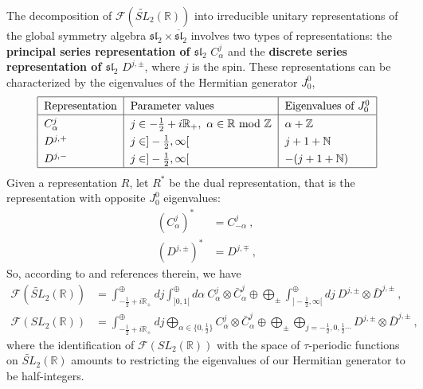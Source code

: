 \documentclass[12pt, a4paper, notitlepage, twoside]{report}
\numberwithin{equation}{section}
\theoremstyle{break}
\begin{document}
The decomposition of $\mathcal{F}(\widetilde{SL}_2(\mathbb{R}))$ into irreducible unitary representations of the global symmetry algebra $\mathfrak{sl}_2\times \overline{\mathfrak{sl}}_2$ involves two types of representations: the \textbf{\boldmath principal series representation of $\mathfrak{sl}_2$} $C^j_\alpha$ and the \textbf{\boldmath discrete series representation of $\mathfrak{sl}_2$} $D^{j,\pm}$, where $j$ is the spin. 
These representations can be characterized by the eigenvalues of the Hermitian generator $J_0^0$,
\begin{align} 
\renewcommand{\arraystretch}{1.3}
\begin{tabular}{|l|l|l|}
  \hline
Representation & Parameter values & Eigenvalues of $J_0^0$
\\
\hline 
$C^j_\alpha$  & $j\in -\tfrac12+i{\mathbb{R}}_+,\ \alpha\in{\mathbb{R}}\ \text{mod}\ {\mathbb{Z}}$ &  $\alpha + {\mathbb{Z}}$ 
\\
$D^{j,+}$ & $j\in]-\tfrac12,\infty[$ & $j+1+{\mathbb{N}}$
\\
$D^{j,-}$ & $j\in]-\tfrac12,\infty[$ & $-(j+1+{\mathbb{N}})$
\\
\hline 
 \end{tabular}
\label{rpe}
\end{align}
Given a representation $R$, let $R^*$ be the dual representation, that is the representation with opposite $J_0^0$ eigenvalues:
\begin{align}
 (C^j_\alpha)^* &= C^j_{-\alpha} \ , 
\\
 (D^{j,\pm})^* &= D^{j,\mp}\ ,
\end{align}
So, according to \cite{rib09} and references therein, we have
\begin{align}
 \mathcal{F}(\widetilde{SL}_2(\mathbb{R})) &= \int^\oplus_{-\frac12+i{\mathbb{R}}_+} dj \int^\oplus_{]0,1[} d\alpha\ C^j_\alpha \otimes \bar{C}^j_{\alpha} \oplus \bigoplus_\pm \int^\oplus_{]-\frac12, \infty[} dj\ D^{j,\pm}\otimes \bar{D}^{j,\pm} \ ,
\label{fst}
\\
 \mathcal{F}(SL_2(\mathbb{R})) &= \int^\oplus_{-\frac12+i{\mathbb{R}}_+} dj \bigoplus_{\alpha\in\{0,\frac12\}} C^j_\alpha \otimes \bar{C}^j_{\alpha} \oplus \bigoplus_\pm \bigoplus_{j=-\frac12, 0,\frac12 \cdots} D^{j,\pm}\otimes \bar{D}^{j,\pm} \ ,
\end{align}
where the identification of $\mathcal{F}(SL_2(\mathbb{R}))$ with the space of $\tau$-periodic functions on $\widetilde{SL}_2(\mathbb{R})$ amounts to restricting the eigenvalues of our Hermitian generator to be half-integers.
\end{document}
